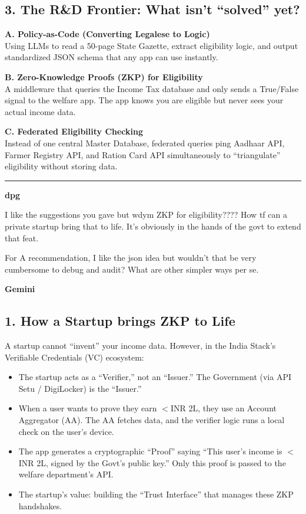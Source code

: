 \documentclass[11pt,a4paper]{article}
\begin{document}
\subsection*{3. The R\&D Frontier: What isn't ``solved'' yet?}

\textbf{A. Policy-as-Code (Converting Legalese to Logic)}\\
Using LLMs to read a 50-page State Gazette, extract eligibility logic, and output standardized JSON schema that any app can use instantly.

\textbf{B. Zero-Knowledge Proofs (ZKP) for Eligibility}\\
A middleware that queries the Income Tax database and only sends a True/False signal to the welfare app. The app knows you are eligible but never sees your actual income data.

\textbf{C. Federated Eligibility Checking}\\
Instead of one central Master Database, federated queries ping Aadhaar API, Farmer Registry API, and Ration Card API simultaneously to ``triangulate'' eligibility without storing data.

\bigskip
\hrule
\bigskip


{\small\color{primary}\textbf{dpg}}
\begin{mebox}
I like the suggestions you gave but wdym ZKP for eligibility???? How tf can a private startup bring that to life. It's obviously in the hands of the govt to extend that feat.

For A recommendation, I like the json idea but wouldn't that be very cumbersome to debug and audit? What are other simpler ways per se.
\end{mebox}

{\small\color{secondary}\textbf{Gemini}}\vspace{2pt}

\subsection*{1. How a Startup brings ZKP to Life}
A startup cannot ``invent'' your income data. However, in the India Stack's Verifiable Credentials (VC) ecosystem:
\begin{itemize}[nosep]
\item The startup acts as a ``Verifier,'' not an ``Issuer.'' The Government (via API Setu / DigiLocker) is the ``Issuer.''
\item When a user wants to prove they earn $<$INR 2L, they use an Account Aggregator (AA). The AA fetches data, and the verifier logic runs a local check on the user's device.
\item The app generates a cryptographic ``Proof'' saying ``This user's income is $<$INR 2L, signed by the Govt's public key.'' Only this proof is passed to the welfare department's API.
\item The startup's value: building the ``Trust Interface'' that manages these ZKP handshakes.
\end{itemize}
\end{document}
